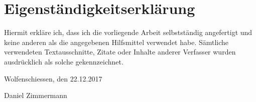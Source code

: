 \chapter*{Eigenständigkeitserklärung}

Hiermit erkläre ich, dass ich die vorliegende Arbeit selbstständig angefertigt und keine anderen als die
angegebenen Hilfsmittel verwendet habe. Sämtliche verwendeten Textausschnitte, Zitate oder Inhalte anderer
Verfasser wurden ausdrücklich als solche gekennzeichnet.

\vskip 1cm


Wolfenschiessen, den 22.12.2017

\vskip 1.5cm

Daniel Zimmermann